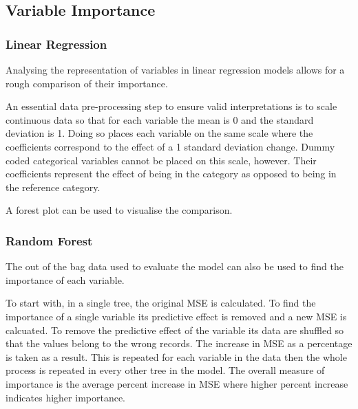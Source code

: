\documentclass[11pt]{article}
\begin{document}


\subsection{Variable Importance}

\subsubsection{Linear Regression}

Analysing the representation of variables in linear regression models allows for a rough comparison of their importance.

An essential data pre-processing step to ensure valid interpretations is to scale continuous data so that for each variable the mean is 0 and the standard deviation is 1. Doing so places each variable on the same scale where the coefficients correspond to the effect of a 1 standard deviation change. Dummy coded categorical variables cannot be placed on this scale, however. Their coefficients represent the effect of being in the category as opposed to being in the reference category.

A forest plot can be used to visualise the comparison.

\subsubsection{Random Forest}

The out of the bag data used to evaluate the model can also be used to find the importance of each variable.

To start with, in a single tree, the original MSE is calculated. To find the importance of a single variable its predictive effect is removed and a new MSE is calcuated. To remove the predictive effect of the variable its data are shuffled so that the values belong to the wrong records. The increase in MSE as a percentage is taken as a result. This is repeated for each variable in the data then the whole process is repeated in every other tree in the model. The overall measure of importance is the average percent increase in MSE where higher percent increase indicates higher importance.
\end{document}
